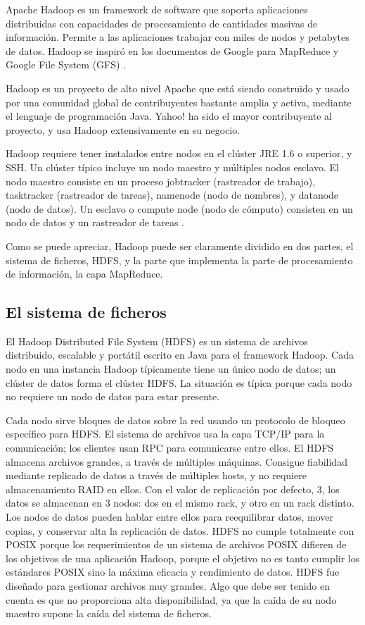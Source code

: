Apache Hadoop es un framework de software que soporta aplicaciones distribuidas con capacidades de procesamiento de cantidades masivas de información. Permite a las aplicaciones trabajar con miles de nodos y petabytes de datos. Hadoop se inspiró en los documentos de Google para MapReduce \cite{paper-mapreduce} y Google File System (GFS) \cite{paper-gfs}.

Hadoop es un proyecto de alto nivel Apache que está siendo construido y usado por una comunidad global de contribuyentes bastante amplia y activa, mediante el lenguaje de programación Java. Yahoo! ha sido el mayor contribuyente al proyecto, y usa Hadoop extensivamente en su negocio.


Hadoop requiere tener instalados entre nodos en el clúster JRE 1.6 o superior, y SSH. Un clúster típico incluye un nodo maestro y múltiples nodos esclavo. El nodo maestro consiste en un proceso jobtracker (rastreador de trabajo), tasktracker (rastreador de tareas), namenode (nodo de nombres), y datanode (nodo de datos). Un esclavo o compute node (nodo de cómputo) consisten en un nodo de datos y un rastreador de tareas . 

Como se puede apreciar, Hadoop puede ser claramente dividido en dos partes, el sistema de ficheros, HDFS, y la parte que implementa la parte de procesamiento de información, la capa MapReduce.

\subsection{El sistema de ficheros}

El Hadoop Distributed File System (HDFS) es un sistema de archivos distribuido, escalable y portátil escrito en Java para el framework Hadoop. Cada nodo en una instancia Hadoop típicamente tiene un único nodo de datos; un clúster de datos forma el clúster HDFS. La situación es típica porque cada nodo no requiere un nodo de datos para estar presente. 

Cada nodo sirve bloques de datos sobre la red usando un protocolo de bloqueo específico para HDFS. El sistema de archivos usa la capa TCP/IP para la comunicación; los clientes usan RPC para comunicarse entre ellos. El HDFS almacena archivos grandes, a través de múltiples máquinas. Consigue fiabilidad mediante replicado de datos a través de múltiples hosts, y no requiere almacenamiento RAID en ellos. Con el valor de replicación por defecto, 3, los datos se almacenan en 3 nodos: dos en el mismo rack, y otro en un rack distinto. Los nodos de datos pueden hablar entre ellos para reequilibrar datos, mover copias, y conservar alta la replicación de datos. HDFS no cumple totalmente con POSIX porque los requerimientos de un sistema de archivos POSIX difieren de los objetivos de una aplicación Hadoop, porque el objetivo no es tanto cumplir los estándares POSIX sino la máxima eficacia y rendimiento de datos. HDFS fue diseñado para gestionar archivos muy grandes. Algo que debe ser tenido en cuenta es que no proporciona alta disponibilidad, ya que la caída de su nodo maestro supone la caída del sistema de ficheros.

